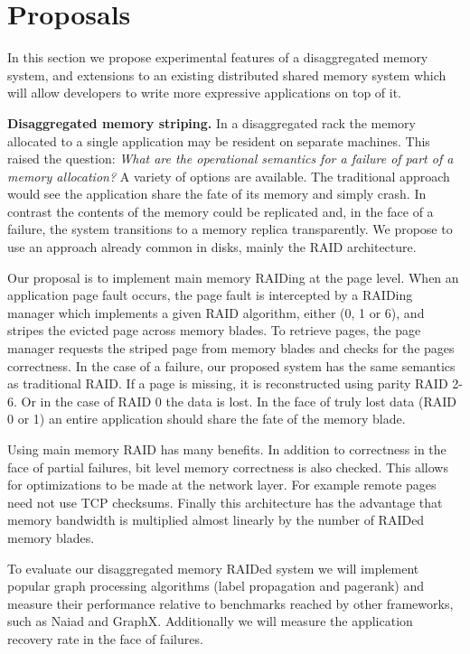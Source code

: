 \section{Proposals}
\label{sec:proposal}
In this section we propose experimental features of a disaggregated
memory system, and extensions to an existing distributed shared memory
system which will allow developers to write more expressive
applications on top of it.


\textbf{Disaggregated memory striping.} In a disaggregated
rack the memory allocated to a single application may be resident on
separate machines. This raised the question: \emph{What are the operational
semantics for a failure of part of a memory allocation?} A variety of
options are available. The traditional approach would see the
application share the fate of its memory and simply crash. In
contrast the contents of the memory could be replicated and, in the
face of a failure, the system transitions to a memory replica transparently.
We propose to use an approach already common in disks, mainly the RAID
architecture.

Our proposal is to implement main memory RAIDing at the page level.
When an application page fault occurs, the page fault is intercepted
by a RAIDing manager which implements a given RAID algorithm, either
(0, 1 or 6), and stripes the evicted page across memory blades. To
retrieve pages, the page manager requests the striped page from memory
blades and checks for the pages correctness. In the case of a failure,
our proposed system has the same semantics as traditional RAID. If a
page is missing, it is reconstructed using parity RAID 2-6. Or in the
case of RAID 0 the data is lost. In the face of truly lost data (RAID
0 or 1) an entire application should share the fate of the memory
blade.

Using main memory RAID has many benefits. In addition to correctness
in the face of partial failures, bit level memory correctness is also
checked.  This allows for optimizations to be made at the network
layer. For example remote pages need not use TCP checksums. Finally
this architecture has the advantage that memory bandwidth is
multiplied almost linearly by the number of RAIDed memory blades.

To evaluate our disaggregated memory RAIDed system we will implement
popular graph processing algorithms (label propagation and pagerank)
and measure their performance relative to benchmarks reached by other
frameworks, such as Naiad and GraphX. Additionally we will measure
the application recovery rate in the face of failures. 

